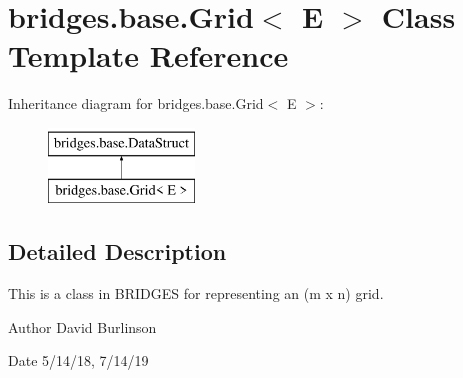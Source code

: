 \hypertarget{classbridges_1_1base_1_1_grid}{}\section{bridges.\+base.\+Grid$<$ E $>$ Class Template Reference}
\label{classbridges_1_1base_1_1_grid}
Inheritance diagram for bridges.\+base.\+Grid$<$ E $>$\+:\begin{figure}[H]
\begin{center}
\leavevmode
\includegraphics[height=2.000000cm]{classbridges_1_1base_1_1_grid}
\end{center}
\end{figure}


\subsection{Detailed Description}
This is a class in B\+R\+I\+D\+G\+ES for representing an (m x n) grid. 

\begin{DoxyAuthor}{Author}
David Burlinson 
\end{DoxyAuthor}
\begin{DoxyDate}{Date}
5/14/18, 7/14/19 
\end{DoxyDate}
